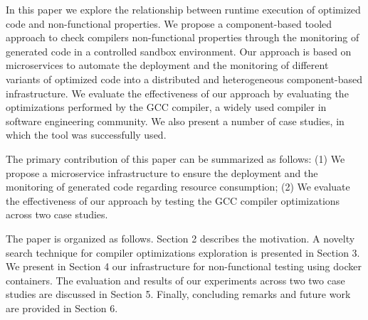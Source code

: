 In this paper we explore the relationship between runtime execution of optimized code and non-functional properties.
We propose a component-based tooled approach to check compilers non-functional properties through the monitoring of generated code in a controlled sandbox environment. 
Our approach is based on microservices to automate the deployment and the monitoring of different variants of optimized code into a distributed and heterogeneous component-based infrastructure. 
We evaluate the effectiveness of our approach by evaluating the optimizations performed by the GCC compiler, a widely used compiler in software engineering community. 
We also present a number of case studies, in which the tool was successfully used.

The primary contribution of this paper can be summarized as follows: 
(1) We propose a microservice infrastructure to ensure the deployment and the monitoring of generated code regarding resource consumption; 
(2) We evaluate the effectiveness of our approach by testing the GCC compiler optimizations across two case studies.
 

The paper is organized as follows.
Section 2 describes the motivation. A novelty search technique for compiler optimizations exploration is presented in Section 3. 
We present in Section 4 our infrastructure for non-functional testing using docker containers. 
The evaluation and results of our experiments across two two case studies are discussed in Section 5. 
Finally, concluding remarks and future work are provided in Section 6.




 
 


